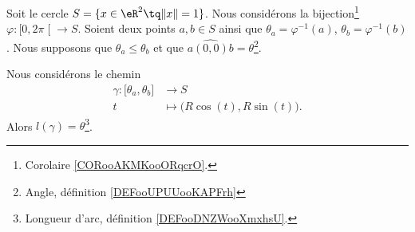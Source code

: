 \begin{proposition}     \label{PROPooDMSTooEOFExj}
	Soit le cercle \( S=\{ x\in \eR^2\tq \| x \|=1 \}\). Nous considérons la bijection\footnote{Corolaire \ref{CORooAKMKooORqcrO}.} \( \varphi\colon \mathopen[ 0 , 2\pi \mathclose[\to S\). Soient deux points \( a,b\in S\) ainsi que \( \theta_a=\varphi^{-1}(a)\), \( \theta_b=\varphi^{-1}(b)\). Nous supposons que \( \theta_a\leq \theta_b\) et que \( \widehat{a(0,0)b}=\theta\)\footnote{Angle, définition \ref{DEFooUPUUooKAPFrh}}.

	Nous considérons le chemin
	\begin{equation}
		\begin{aligned}
			\gamma\colon \mathopen[ \theta_a , \theta_b \mathclose] & \to S                                  \\
			t                                                       & \mapsto \big( R\cos(t),R\sin(t) \big).
		\end{aligned}
	\end{equation}
	Alors \( l(\gamma)=\theta\)\footnote{Longueur d'arc, définition \ref{DEFooDNZWooXmxhsU}.}.
\end{proposition}


